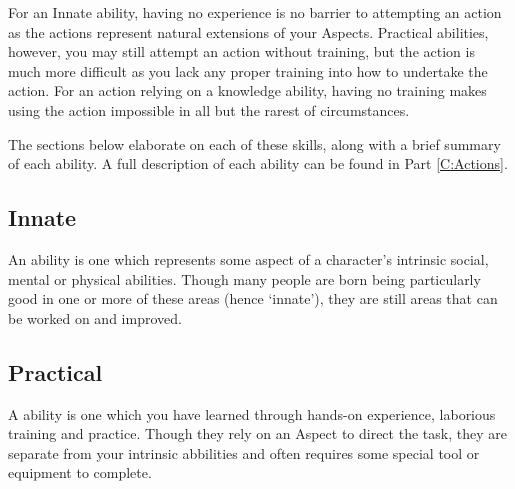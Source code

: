 For an Innate ability, having no experience is no barrier to attempting an action as the actions represent natural extensions of your Aspects. Practical abilities, however, you may still attempt an action without training, but the action is much more difficult as you lack any proper training into how to undertake the action. For an action relying on a knowledge ability, having no training makes using the action impossible in all but the rarest of circumstances.

The sections below elaborate on each of these skills, along with a brief summary of each ability. A full description of each ability can be found in Part \ref{C:Actions}.


\subsection{Innate}

An  ability is one which represents some aspect of a character's intrinsic social, mental or physical abilities. Though many people are born being particularly good in one or more of these areas (hence `innate'), they are still areas that can be worked on and improved. 


\abilityTable
{
}


\subsection{Practical}

A  ability is one which you have learned through hands-on experience, laborious training and practice. Though they rely on an Aspect to direct the task, they are separate from your intrinsic abbilities and often requires some special tool or equipment to complete. 

